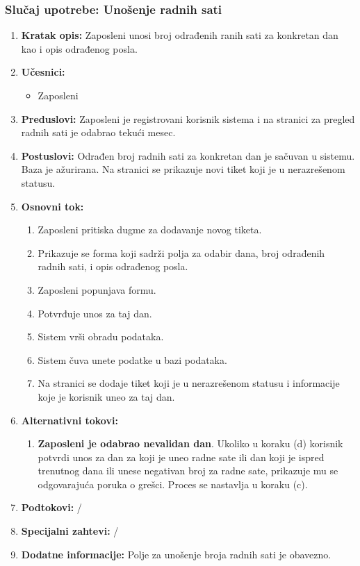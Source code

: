 \documentclass[a4paper]{article}
\begin{document}
\subsubsection{Slučaj upotrebe: Unošenje radnih sati}
\begin{enumerate}
    \item \textbf{Kratak opis:} Zaposleni unosi broj odrađenih ranih sati za konkretan dan kao i opis odrađenog posla.
    \item \textbf{Učesnici:}
        \begin{itemize}
            \item Zaposleni
        \end{itemize}
    \item \textbf{Preduslovi:} Zaposleni je registrovani korisnik sistema i na stranici za pregled radnih sati je odabrao tekući mesec.
    \item \textbf{Postuslovi:} Odrađen broj radnih sati za konkretan dan je sačuvan u sistemu. Baza je ažurirana. Na stranici se prikazuje novi tiket koji je u nerazrešenom statusu.
    \item \textbf{Osnovni tok:}
        \begin{enumerate}
            \item Zaposleni pritiska dugme za dodavanje novog tiketa.
            \item Prikazuje se forma koji sadrži polja za odabir dana, broj odrađenih radnih sati, i opis odrađenog posla.
            \item Zaposleni popunjava formu.
            \item Potvrđuje unos za taj dan.
            \item Sistem vrši obradu podataka.
            \item Sistem čuva unete podatke u bazi podataka.
            \item Na stranici se dodaje tiket koji je u nerazrešenom statusu i informacije koje je korisnik uneo za taj dan.
        \end{enumerate}
    \item \textbf{Alternativni tokovi:}
        \begin{enumerate}
            \item \textbf{Zaposleni je odabrao nevalidan dan}. Ukoliko u koraku (d) korisnik potvrdi unos za dan za koji je uneo radne sate ili dan koji je ispred trenutnog dana ili unese negativan broj za radne sate, prikazuje mu se odgovarajuća poruka o grešci. Proces se nastavlja u koraku (c).
        \end{enumerate}
    \item \textbf{Podtokovi:} /
    \item \textbf{Specijalni zahtevi:} /
    \item \textbf{Dodatne informacije:} Polje za unošenje broja radnih sati je obavezno.
\end{enumerate}
\end{document}
